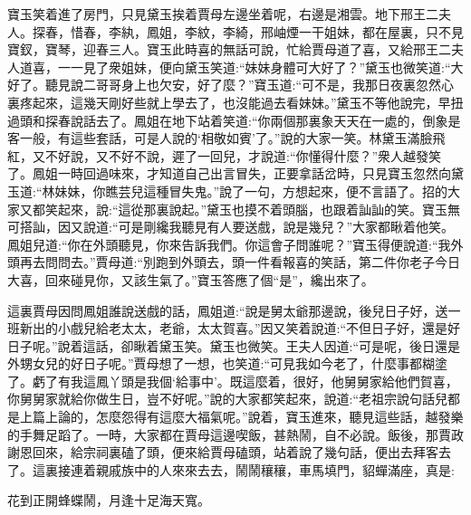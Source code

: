 \begin{parag}
    寶玉笑着進了房門，只見黛玉挨着賈母左邊坐着呢，右邊是湘雲。地下邢王二夫人。探春，惜春，李紈，鳳姐，李紋，李綺，邢岫煙一干姐妹，都在屋裏，只不見寶釵，寶琴，迎春三人。寶玉此時喜的無話可說，忙給賈母道了喜，又給邢王二夫人道喜，一一見了衆姐妹，便向黛玉笑道:“妹妹身體可大好了？”黛玉也微笑道:“大好了。聽見說二哥哥身上也欠安，好了麼？”寶玉道:“可不是，我那日夜裏忽然心裏疼起來，這幾天剛好些就上學去了，也沒能過去看妹妹。”黛玉不等他說完，早扭過頭和探春說話去了。鳳姐在地下站着笑道:“你兩個那裏象天天在一處的，倒象是客一般，有這些套話，可是人說的‘相敬如賓’了。”說的大家一笑。林黛玉滿臉飛紅，又不好說，又不好不說，遲了一回兒，才說道:“你懂得什麼？”衆人越發笑了。鳳姐一時回過味來，才知道自己出言冒失，正要拿話岔時，只見寶玉忽然向黛玉道:“林妹妹，你瞧芸兒這種冒失鬼。”說了一句，方想起來，便不言語了。招的大家又都笑起來，說:“這從那裏說起。”黛玉也摸不着頭腦，也跟着訕訕的笑。寶玉無可搭訕，因又說道:“可是剛纔我聽見有人要送戲，說是幾兒？”大家都瞅着他笑。鳳姐兒道:“你在外頭聽見，你來告訴我們。你這會子問誰呢？”寶玉得便說道:“我外頭再去問問去。”賈母道:“別跑到外頭去，頭一件看報喜的笑話，第二件你老子今日大喜，回來碰見你，又該生氣了。”寶玉答應了個“是”，纔出來了。
\end{parag}


\begin{parag}
    這裏賈母因問鳳姐誰說送戲的話，鳳姐道:“說是舅太爺那邊說，後兒日子好，送一班新出的小戲兒給老太太，老爺，太太賀喜。”因又笑着說道:“不但日子好，還是好日子呢。”說着這話，卻瞅着黛玉笑。黛玉也微笑。王夫人因道:“可是呢，後日還是外甥女兒的好日子呢。”賈母想了一想，也笑道:“可見我如今老了，什麼事都糊塗了。虧了有我這鳳丫頭是我個‘給事中’。既這麼着，很好，他舅舅家給他們賀喜，你舅舅家就給你做生日，豈不好呢。”說的大家都笑起來，說道:“老祖宗說句話兒都是上篇上論的，怎麼怨得有這麼大福氣呢。”說着，寶玉進來，聽見這些話，越發樂的手舞足蹈了。一時，大家都在賈母這邊喫飯，甚熱鬧，自不必說。飯後，那賈政謝恩回來，給宗祠裏磕了頭，便來給賈母磕頭，站着說了幾句話，便出去拜客去了。這裏接連着親戚族中的人來來去去，鬧鬧穰穰，車馬填門，貂蟬滿座，真是:
\end{parag}


\begin{poem}
    \begin{pl}
        花到正開蜂蝶鬧，月逢十足海天寬。
    \end{pl}
\end{poem}


